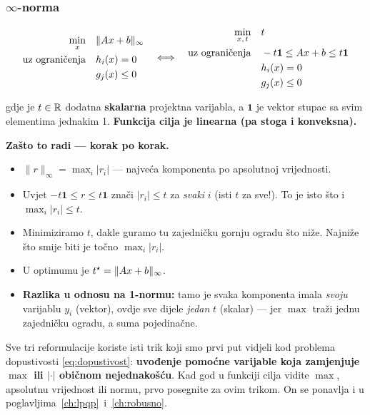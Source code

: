 \subsubsection*{$\infty$-norma }

\[
\begin{aligned}
\min_x \quad & \|Ax + b\|_\infty \\
\uzogr & h_i(x) = 0 \\
& g_j(x) \le 0
\end{aligned}
\quad\Longleftrightarrow\quad
\begin{aligned}
\min_{x,\,t} \quad & t \\
\uzogr & -t\mathbf{1} \le Ax + b \le t\mathbf{1} \\
& h_i(x) = 0 \\
& g_j(x) \le 0
\end{aligned}
\]

gdje je $t \in \R$ dodatna \textbf{skalarna} projektna varijabla, a
$\mathbf{1}$ je vektor stupac sa svim elementima jednakim 1. \textbf{Funkcija
cilja je linearna (pa stoga i konveksna).}

\textbf{Zašto to radi --- korak po korak.}
\begin{itemize}
  \item $\|r\|_\infty = \max_i |r_i|$ --- najveća komponenta po apsolutnoj
        vrijednosti.
  \item Uvjet $-t\mathbf{1} \le r \le t\mathbf{1}$ znači $|r_i| \le t$ za
        \emph{svaki} $i$ (isti $t$ za sve!). To je isto što i
        $\max_i|r_i| \le t$.
  \item Minimiziramo $t$, dakle guramo tu zajedničku gornju ogradu što niže.
        Najniže što smije biti je točno $\max_i|r_i|$.
  \item U optimumu je $t\opt = \|Ax+b\|_\infty$. \checkmark
  \item \textbf{Razlika u odnosu na 1-normu:} tamo je svaka komponenta imala
        \emph{svoju} varijablu $y_i$ (vektor), ovdje sve dijele \emph{jedan}
        $t$ (skalar) --- jer $\max$ traži jednu zajedničku ogradu, a suma
        pojedinačne.
\end{itemize}

\begin{napomena}
Sve tri reformulacije koriste isti trik koji smo prvi put vidjeli kod problema
dopustivosti \eqref{eq:dopustivost}: \textbf{uvođenje pomoćne varijable koja
zamjenjuje $\max$ ili $|\cdot|$ običnom nejednakošću}. Kad god u funkciji cilja
vidite $\max$, apsolutnu vrijednost ili normu, prvo posegnite za ovim trikom.
On se ponavlja i u poglavljima~\ref{ch:lpqp}~i~\ref{ch:robusno}.
\end{napomena}

